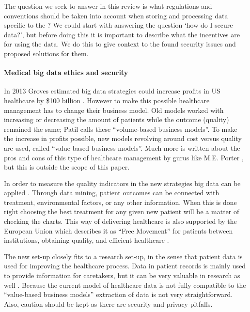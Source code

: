 The question we seek to answer in this review is what regulations and conventions should be taken into account when storing and processing data specific to the \ivfsystem{}?
We could start with answering the question `how do I secure data?', but before doing this it is important to describe what the incentives are for using the data.
We do this to give context to the found security issues and proposed solutions for them.

\paragraph{Medical big data ethics and security}
\label{security-ethics}

In 2013 Groves \cite{s20Groves2013} estimated big data strategies could increase profits in US healthcare by \$100 billion \cite{s13Patil2014}.
However to make this possible healthcare management has to change their business model.
Old models worked with increasing or decreasing the amount of patients while the outcome (quality) remained the same; Patil \cite{s13Patil2014} calls these ``volume-based business models''.
To make the increase in profits possible, new models revolving around cost versus quality are used, called ``value-based business models''.
Much more is written about the pros and cons of this type of healthcare management by gurus like M.E. Porter \cite{s21Porter2006}, but this is outside the scope of this paper.

In order to measure the quality indicators in the new strategies big data can be applied \cite{s6West2009}. 
Through data mining, patient outcomes can be connected with treatment, environmental factors, or any other information.
When this is done right choosing the best treatment for any given new patient will be a matter of checking the charts.
This way of delivering healthcare is also supported by the European Union which describes it as ``Free Movement'' for patients between institutions, obtaining quality, and efficient healthcare \cite{s8FernandezAleman2013}.

The new set-up closely fits to a research set-up, in the sense that patient data is used for improving the healthcare process.
Data in patient records is mainly used to provide information for caretakers, but it can be very valuable in research as well \cite{s15Fenz2014}.
Because the current model of healthcare data is not fully compatible to the ``value-based business models'' extraction of data is not very straightforward.
Also, caution should be kept as there are security and privacy pitfalls.

